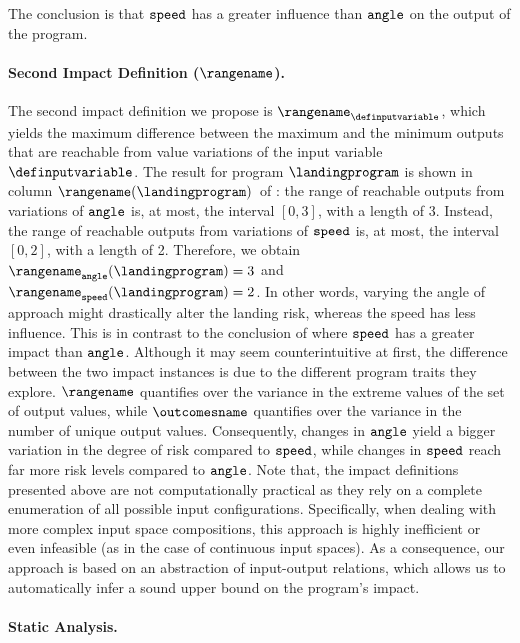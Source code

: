 The conclusion is that $\texttt{speed}$ has a greater influence than $\texttt{angle}$ on the output of the program.

\paragraph{Second Impact Definition {\normalfont(\texorpdfstring{$\rangename$}{Range})}.}
%
The second impact definition we propose is $\rangename_\definputvariable$, which yields the maximum difference between the maximum and the minimum outputs that are reachable from value variations of the input variable $\definputvariable$.
The result for program $\landingprogram$ is shown in column $\rangename(\landingprogram)$~of :
the range of reachable outputs from variations of $\texttt{angle}$ is, at most, the interval $[0, 3]$, with a length of 3. Instead, the range of reachable outputs from variations of $\texttt{speed}$ is, at most, the interval $[0, 2]$, with a length of 2. Therefore, we obtain $\rangename_\x(\landingprogram)=3$ and $\rangename_\y(\landingprogram)=2$.
In other words, varying the angle of approach might drastically alter the landing risk, whereas the speed has less influence.
%
This is in contrast to the conclusion of \outcomesname{} where $\texttt{speed}$ has a greater impact than $\texttt{angle}$.
Although it may seem counterintuitive at first, the difference between the two impact instances is due to the different program traits they explore.
$\rangename$ quantifies over the variance in the extreme values of the set of output values, while $\outcomesname$ quantifies over the variance in the number of unique output values.
Consequently, changes in $\texttt{angle}$ yield a bigger variation in the degree of risk compared to $\texttt{speed}$, while changes in $\texttt{speed}$ reach far more risk levels compared to $\texttt{angle}$.
%
Note that, the impact definitions presented above are not computationally practical as they rely on a complete enumeration of all possible input configurations.
Specifically, when dealing with more complex input space compositions, this approach is highly inefficient or even infeasible (as in the case of continuous input spaces).
As a consequence, our approach is based on an abstraction of input-output relations, which allows us to automatically infer a sound upper bound on the program's impact.

\paragraph{Static Analysis.}

